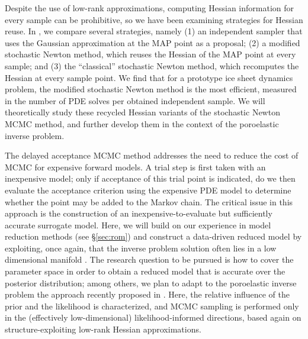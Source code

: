 \documentclass[11pt,final]{article}%
\begin{document}
Despite the use of low-rank approximations, computing Hessian
information for every sample can be prohibitive, so we have
been examining strategies for Hessian reuse. In
\cite{PetraMartinStadlerEtAl13}, we compare several strategies, 
namely (1) an independent sampler that uses the Gaussian approximation
at the MAP point as a proposal; (2) a modified stochastic Newton
method, which reuses the Hessian of the MAP point at every sample; and
(3) the ``classical'' stochastic Newton method, which recomputes the
Hessian at every sample point. We find that
for a prototype ice sheet dynamics problem, the modified stochastic Newton
method is the most efficient, measured in the number of PDE solves per
obtained independent sample.
We will theoretically study these recycled Hessian variants
of the stochastic Newton MCMC method, and further develop them in the
context of the poroelastic inverse problem.

The delayed acceptance MCMC method \cite{EfendievHouLuo06,ChristenFox05}
addresses the need to reduce the cost of MCMC for expensive forward
models. A trial step is first taken with an inexpensive model; only if
acceptance of this trial point is indicated, do we then evaluate the
acceptance criterion using the expensive PDE model to determine
whether the point may be added to the Markov chain. 
The critical issue in this approach is the construction of an
inexpensive-to-evaluate but sufficiently accurate surrogate
model. Here, we will build on our experience in model reduction
methods (see \S\ref{sec:rom}) and construct a data-driven reduced
model by exploiting, once again, that the inverse problem solution
often lies in a low dimensional manifold \cite{CuiMarzoukWillcox14}.
The research question to be pursued is how to cover the parameter
space in order to obtain a reduced model that is accurate over the
posterior distribution; among others, we plan to adapt to the
poroelastic inverse problem the approach recently proposed in
\cite{CuiMartinMarzoukEtAl14}. Here, the relative influence of the
prior and the likelihood is characterized, and MCMC sampling is
performed only in the (effectively low-dimensional)
likelihood-informed directions, based again on structure-exploiting
low-rank Hessian approximations.
\end{document}
